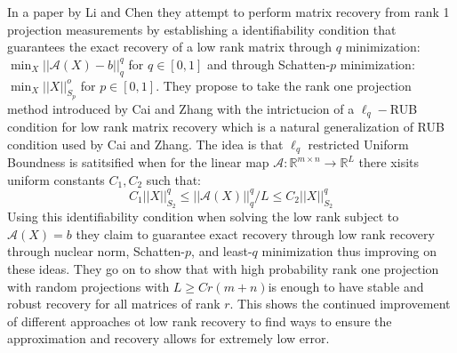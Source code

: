 \documentclass[12pt]{article}
\newcommand{\R}{\mathbb{R}}
\begin{document}
In a paper by Li and Chen they attempt to perform matrix recovery from rank 1 projection measurements by establishing a identifiability condition that guarantees the exact recovery of a low rank matrix through $q$ minimization: $\min_X||\mathcal{A}(X) -b||^q_q$ for $q\in [0,1]$ and through Schatten-$p$ minimization: $\min_X||X||^o_{S_p}$ for $p\in [0,1]$. They propose to take the rank one projection method introduced by Cai and Zhang with the intrictucion of a $\ell_q-$RUB condition for low rank matrix recovery which is a natural generalization of RUB condition used by Cai and Zhang. The idea is that $\ell_q $ restricted Uniform Boundness is satitsified when for the linear map $\mathcal{A}:\R^{m\times n} \to \R^L$ there xisits uniform constants $C_1,C_2$ such that:\[ C_1||X||^q_{S_2} \leq ||\mathcal{A}(X)||^q_q/L \leq C_2||X||^q_{S_2}\]
Using this identifiability condition when solving the low rank subject to $\mathcal{A}(X) = b$ they claim to guarantee exact recovery through low rank recovery through nuclear norm, Schatten-$p$, and least-$q$ minimization thus improving on these ideas. They go on to show that with high probability rank one projection with random projections with $L \ge Cr(m+n)$is enough to have stable and robust recovery for all matrices of rank $r$. This shows the continued improvement of different approaches ot low rank recovery to find ways to ensure the approximation and recovery allows for extremely low error. 
\end{document}
